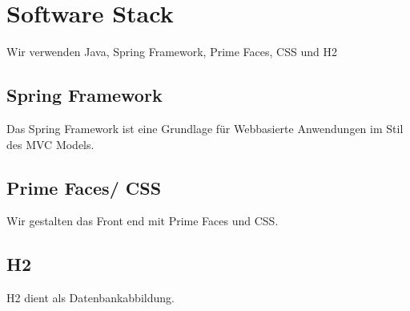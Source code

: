 \newpage
\section{Software Stack}
Wir verwenden Java, Spring Framework, Prime Faces, CSS und H2

\subsection{Spring Framework}
Das Spring Framework ist eine Grundlage für Webbasierte Anwendungen im Stil des MVC Models.

\subsection{Prime Faces/ CSS}
Wir gestalten das Front end mit Prime Faces und CSS.

\subsection{H2}
H2 dient als Datenbankabbildung.
